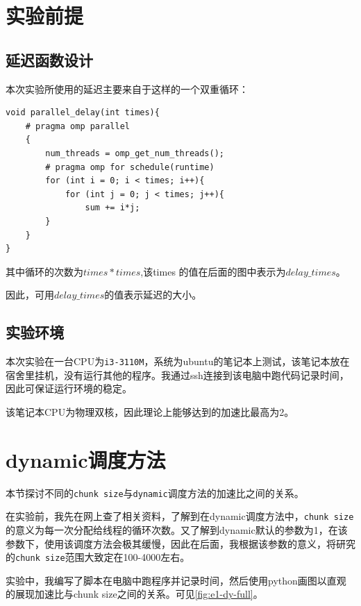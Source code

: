 \documentclass[forprint]{myreport}
\begin{document}
\section{实验前提}

\subsection{延迟函数设计}

本次实验所使用的延迟主要来自于这样的一个双重循环：
\begin{lstlisting}[style = c++]
void parallel_delay(int times){
    # pragma omp parallel
    {
        num_threads = omp_get_num_threads();
        # pragma omp for schedule(runtime)
        for (int i = 0; i < times; i++){
            for (int j = 0; j < times; j++){
                sum += i*j;             
        }
    }
}
\end{lstlisting}

其中循环的次数为$ times * times $,该times 的值在后面的图中表示为$delay\_times$。

因此，可用$delay\_times$的值表示延迟的大小。

\subsection{实验环境}

本次实验在一台CPU为\texttt{i3-3110M}，系统为ubuntu的笔记本上测试，该笔记本放在宿舍里挂机，没有运行其他的程序。我通过ssh连接到该电脑中跑代码记录时间，因此可保证运行环境的稳定。

该笔记本CPU为物理双核，因此理论上能够达到的加速比最高为2。

\section{dynamic调度方法}

本节探讨不同的\texttt{chunk size}与\texttt{dynamic}调度方法的加速比之间的关系。

在实验前，我先在网上查了相关资料，了解到在dynamic调度方法中，\texttt{chunk size}的意义为每一次分配给线程的循环次数。又了解到dynamic默认的参数为1，在该参数下，使用该调度方法会极其缓慢，因此在后面，我根据该参数的意义，将研究的\texttt{chunk size}范围大致定在100-4000左右。

实验中，我编写了脚本在电脑中跑程序并记录时间，然后使用python画图以直观的展现加速比与chunk size之间的关系。可见\autoref{fig:e1-dy-full}。
\end{document}
